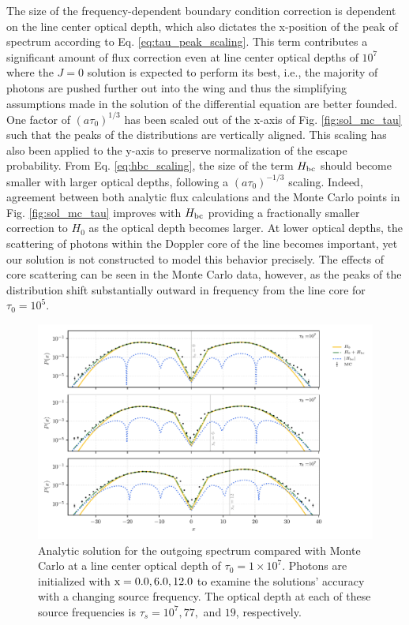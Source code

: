 \documentclass{aastex63}
\begin{document}
The size of the frequency-dependent boundary condition correction is dependent on the line center optical depth, which also dictates the x-position of the peak of spectrum according to Eq. \ref{eq:tau_peak_scaling}. This term contributes a significant amount of flux correction even at line center optical depths of $10^7$ where the $J=0$ solution is expected to perform its best, i.e., the majority of photons are pushed further out into the wing and thus the simplifying assumptions made in the solution of the differential equation are better founded. One factor of $(a\tau_0)^{1/3}$ has been scaled out of the x-axis of Fig. \ref{fig:sol_mc_tau} such that the peaks of the distributions are vertically aligned. This scaling has also been applied to the y-axis to preserve normalization of the escape probability. From Eq. \ref{eq:hbc_scaling}, the size of the term $H_{\rm bc}$ should become smaller with larger optical depths, following a $(a\tau_0)^{-1/3}$ scaling. Indeed, agreement between both analytic flux calculations and the Monte Carlo points in Fig. \ref{fig:sol_mc_tau} improves with $H_{\rm bc}$ providing a fractionally smaller correction to $H_0$ as the optical depth becomes larger. At lower optical depths, the scattering of photons within the Doppler core of the line becomes important, yet our solution is not constructed to model this behavior precisely. The effects of core scattering can be seen in the Monte Carlo data, however, as the peaks of the distribution shift substantially outward in frequency from the line core for $\tau_0 = 10^5$.
 
 \begin{figure}
    \centering
    \includegraphics{xinit_threepanel.pdf}
    \caption{Analytic solution for the outgoing spectrum compared with Monte Carlo at a line center optical depth of $\tau_0 = 1 \times 10^7$. Photons are initialized with $\rm x = 0.0, 6.0, 12.0$ to examine the solutions' accuracy with a changing source frequency. The optical depth at each of these source frequencies is $\tau_s = 10^7, 77,$ and $19$, respectively.} 
    \label{fig:sol_mc_xinit}
\end{figure}
\end{document}

